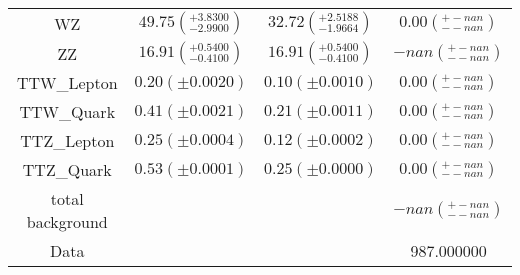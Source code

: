 \begin{tabular}{|c|ccc|}
WZ                                                 &  $49.75(^{+3.8300}_{-2.9900})$ &  $32.72(^{+2.5188}_{-1.9664})$ &       $0.00(^{+-nan}_{--nan})$ \\
ZZ                                                 &  $16.91(^{+0.5400}_{-0.4100})$ &  $16.91(^{+0.5400}_{-0.4100})$ &       $-nan(^{+-nan}_{--nan})$ \\
TTW_Lepton                                         &              $0.20(\pm0.0020)$ &              $0.10(\pm0.0010)$ &       $0.00(^{+-nan}_{--nan})$ \\
TTW_Quark                                          &              $0.41(\pm0.0021)$ &              $0.21(\pm0.0011)$ &       $0.00(^{+-nan}_{--nan})$ \\
TTZ_Lepton                                         &              $0.25(\pm0.0004)$ &              $0.12(\pm0.0002)$ &       $0.00(^{+-nan}_{--nan})$ \\
TTZ_Quark                                          &              $0.53(\pm0.0001)$ &              $0.25(\pm0.0000)$ &       $0.00(^{+-nan}_{--nan})$ \\
total background & & & $-nan(^{+-nan}_{--nan})$ \\
\hline
Data & & & 987.000000 \\
\hline
\end{tabular}
